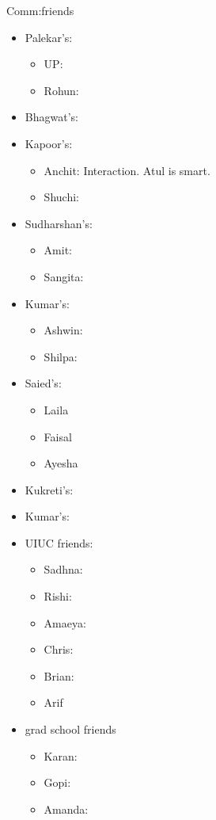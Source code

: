 \documentclass[serif, mathserif, final]{beamer}
\begin{document}
\begin{frame}
\begin{columns}
\begin{column}{0.25\linewidth}
\begin{block}{Comm:friends} 
\begin{itemize} 
\item Palekar’s:  
\begin{itemize}
\item UP: 
\item Rohun: 
\end{itemize} 

\item Bhagwat’s: 

\item Kapoor’s: 
\begin{itemize}
\item \tiny Anchit: 
Interaction. Atul is smart. 
\item \tiny Shuchi: 
\end{itemize}

\item Sudharshan’s: 
\begin{itemize} 
\tiny \item \tiny Amit:  
\item \tiny Sangita:  
\end{itemize} 

\item Kumar’s:
\begin{itemize}
\tiny \item \tiny Ashwin: 
\item \tiny Shilpa: 
\end{itemize} 

\item Saied’s: 
\begin{itemize}
\tiny \item \tiny Laila 
\item \tiny Faisal 
\item \tiny Ayesha
\end{itemize} 

\item Kukreti’s:

\item Kumar’s:
\item UIUC friends: 
\begin{itemize} 
\tiny \item \tiny Sadhna: 
\item \tiny Rishi: 
\item \tiny Amaeya: 
\item \tiny Chris: 
\item \tiny Brian: 
\item \tiny Arif 
\end{itemize} 
\item grad school friends 
\begin{itemize} 
\tiny \item \tiny  Karan: 
\item \tiny Gopi: 
\item \tiny Amanda:  
\end{itemize}


\end{itemize}
\end{block}
\end{column}
\end{columns}
\end{frame}
\end{document}
